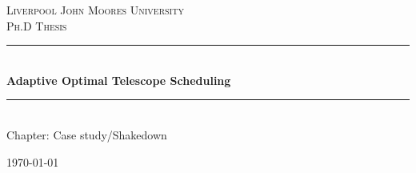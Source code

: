 \documentclass[12pt,a4paper]{article}
\newcommand{\HRule}{\rule{\linewidth}{0.5mm}}
\numberwithin{figure}{section}
\numberwithin{table}{section}
\numberwithin{algorithm}{section}
\begin{document}
\setlength{\parindent}{5mm}
\setlength{\parskip}{10pt plus2mm minus2mm}
\thispagestyle{empty}

\begin{titlepage}
 
\begin{center}
 
\textsc{\LARGE Liverpool John Moores University}\\[1.5cm]
 
\textsc{\Large Ph.D Thesis}\\[0.5cm]
 
 
\HRule \\[0.4cm]
{ \Large \bfseries Adaptive Optimal Telescope Scheduling}\\[0.4cm]
 
\HRule \\[1.5cm]
 
{ \large Chapter: Case study/Shakedown}
 
\vfill
 
{\large \today}
 
\end{center}
 
\end{titlepage}


\end{document}
